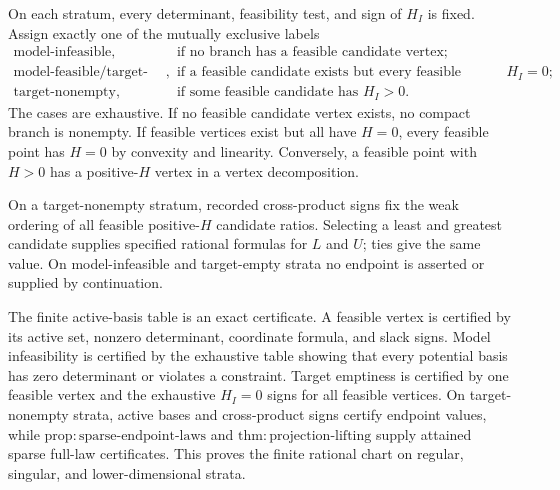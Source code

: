 On each stratum, every determinant, feasibility test, and sign of \(H_I\) is fixed. Assign exactly one of the mutually exclusive labels
\[
 \begin{array}{ll}
 \text{model-infeasible},
   &\text{if no branch has a feasible candidate vertex};\\
 \text{model-feasible/target-empty},
   &\text{if a feasible candidate exists but every feasible candidate has }H_I=0;\\
 \text{target-nonempty},
   &\text{if some feasible candidate has }H_I>0.
 \end{array}
\]
The cases are exhaustive. If no feasible candidate vertex exists, no compact branch is nonempty. If feasible vertices exist but all have \(H=0\), every feasible point has \(H=0\) by convexity and linearity. Conversely, a feasible point with \(H>0\) has a positive-\(H\) vertex in a vertex decomposition.

On a target-nonempty stratum, recorded cross-product signs fix the weak ordering of all feasible positive-\(H\) candidate ratios. Selecting a least and greatest candidate supplies specified rational formulas for \(L\) and \(U\); ties give the same value. On model-infeasible and target-empty strata no endpoint is asserted or supplied by continuation.

The finite active-basis table is an exact certificate. A feasible vertex is certified by its active set, nonzero determinant, coordinate formula, and slack signs. Model infeasibility is certified by the exhaustive table showing that every potential basis has zero determinant or violates a constraint. Target emptiness is certified by one feasible vertex and the exhaustive \(H_I=0\) signs for all feasible vertices. On target-nonempty strata, active bases and cross-product signs certify endpoint values, while \(\mathrm{prop:sparse\text{-}endpoint\text{-}laws}\) and \(\mathrm{thm:projection\text{-}lifting}\) supply attained sparse full-law certificates. This proves the finite rational chart on regular, singular, and lower-dimensional strata.
